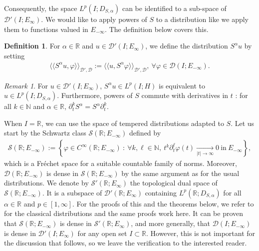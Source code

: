 \documentclass[11pt, letterpaper]{amsart}
\theoremstyle{definition}
\newtheorem{defn}[thm]{Definition}
\theoremstyle{remark}
\newtheorem{rem}[thm]{Remark}
\newcommand{\llangle}{\langle\!\langle}
\newcommand{\rrangle}{\rangle\!\rangle}
\numberwithin{equation}{section}
\begin{document}
Consequently, the space $L^p(I; D_{S,\alpha})$ can be identified to a sub-space of $\mathcal{D}'( I; E_\infty)$. We would like to apply powers of $S$ to a distribution like we apply them to functions valued in $E_{-\infty}.$ The definition below covers this.
\begin{defn}
    For $\alpha \in \mathbb{R}$ and $u \in \mathcal{D}'( I ; E_\infty)$, we define the distribution $ S^\alpha u $ by setting  
    \begin{align*}
        \llangle S^\alpha u , \varphi \rrangle_{\mathcal{D}',\mathcal{D}} := \llangle  u , S^\alpha\varphi \rrangle_{\mathcal{D}',\mathcal{D}}, \ \forall \varphi \in \mathcal{D}(I; E_{-\infty}).
    \end{align*}
\end{defn}
\begin{rem}
    For $u \in \mathcal{D}'( I ; E_\infty)$, $S^\alpha u \in L^p(I; H)$ is equivalent to $ u \in L^p(I; D_{S,\alpha})$. Furthermore, powers of $S$ commute with  derivatives in $t$ : for all $ k \in \mathbb{N}$ and $ \alpha \in \mathbb{R}$, $\partial_t^k S^\alpha  = S^\alpha \partial_t^k $. 
\end{rem}
When $I=\mathbb{R}$, we can use the space of tempered distributions adapted to $S$. Let us start by the Schwartz class $\mathcal{S}(\mathbb{R};E_{-\infty})$ defined by
\begin{align*}
    \mathcal{S}(\mathbb{R};E_{-\infty}):= \left \{ \varphi \in C^\infty(\mathbb{R};E_{-\infty}) \ : \ \forall k, \ell \in \mathbb{N}, \ t^k \partial_t^\ell \varphi(t) \underset{\left | t \right |\to \infty}{\rightarrow}0 \ \mathrm{in} \ E_{-\infty}  \right \},
\end{align*}
which is a Fréchet space for a suitable countable family of norms.  Moreover, $\mathcal{D}(\mathbb{R}; E_{-\infty})$ is dense in $\mathcal{S}(\mathbb{R};E_{-\infty})$ by the same argument as for the usual distributions. We denote by $\mathcal{S'}(\mathbb{R};E_\infty)$ the topological dual space of $\mathcal{S}(\mathbb{R};E_{-\infty})$. It is a subspace of $\mathcal{D}'(\mathbb{R}; E_{\infty})$ containing $L^p(\mathbb{R}; D_{S,\alpha})$ for all $\alpha \in \mathbb{R}$ and $p \in [1,\infty]$. For the proofs of this and the theorems below, we refer to \cite{zuily2002elements} for the classical distributions and the same proofs work here. It can be proven that $\mathcal{S}(\mathbb{R};E_{-\infty})$ is dense in $\mathcal{S'}(\mathbb{R};E_\infty)$, and more generally, that $\mathcal{D}(I;E_{-\infty})$ is dense in $\mathcal{D'}(I;E_\infty)$ for any open set $I \subset \mathbb{R}$. However, this is not important for the discussion that follows, so we leave the verification to the interested reader.
\end{document}
